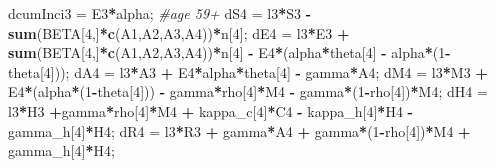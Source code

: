 \documentclass[
]{article}
\newenvironment{Shaded}{\begin{snugshade}}{\end{snugshade}}
\newcommand{\CommentTok}[1]{\textcolor[rgb]{0.56,0.35,0.01}{\textit{#1}}}
\newcommand{\DecValTok}[1]{\textcolor[rgb]{0.00,0.00,0.81}{#1}}
\newcommand{\KeywordTok}[1]{\textcolor[rgb]{0.13,0.29,0.53}{\textbf{#1}}}
\newcommand{\NormalTok}[1]{#1}
\newcommand{\OperatorTok}[1]{\textcolor[rgb]{0.81,0.36,0.00}{\textbf{#1}}}
\newcommand{\StringTok}[1]{\textcolor[rgb]{0.31,0.60,0.02}{#1}}
\begin{document}
\begin{Shaded}
\begin{Highlighting}[]
\NormalTok{    dcumInci3 =}\StringTok{ }\NormalTok{E3}\OperatorTok{*}\NormalTok{alpha;}
  \CommentTok{#age 59+}
\NormalTok{    dS4 =}\StringTok{ }\NormalTok{l3}\OperatorTok{*}\NormalTok{S3 }\OperatorTok{-}\StringTok{ }\KeywordTok{sum}\NormalTok{(BETA[}\DecValTok{4}\NormalTok{,]}\OperatorTok{*}\KeywordTok{c}\NormalTok{(A1,A2,A3,A4))}\OperatorTok{*}\NormalTok{n[}\DecValTok{4}\NormalTok{];}
\NormalTok{    dE4 =}\StringTok{ }\NormalTok{l3}\OperatorTok{*}\NormalTok{E3 }\OperatorTok{+}\StringTok{ }\KeywordTok{sum}\NormalTok{(BETA[}\DecValTok{4}\NormalTok{,]}\OperatorTok{*}\KeywordTok{c}\NormalTok{(A1,A2,A3,A4))}\OperatorTok{*}\NormalTok{n[}\DecValTok{4}\NormalTok{] }\OperatorTok{-}\StringTok{ }\NormalTok{E4}\OperatorTok{*}\NormalTok{(alpha}\OperatorTok{*}\NormalTok{theta[}\DecValTok{4}\NormalTok{] }\OperatorTok{-}\StringTok{ }\NormalTok{alpha}\OperatorTok{*}\NormalTok{(}\DecValTok{1}\OperatorTok{-}\NormalTok{theta[}\DecValTok{4}\NormalTok{]));}
\NormalTok{    dA4 =}\StringTok{ }\NormalTok{l3}\OperatorTok{*}\NormalTok{A3 }\OperatorTok{+}\StringTok{ }\NormalTok{E4}\OperatorTok{*}\NormalTok{alpha}\OperatorTok{*}\NormalTok{theta[}\DecValTok{4}\NormalTok{] }\OperatorTok{-}\StringTok{ }\NormalTok{gamma}\OperatorTok{*}\NormalTok{A4;}
\NormalTok{    dM4 =}\StringTok{ }\NormalTok{l3}\OperatorTok{*}\NormalTok{M3 }\OperatorTok{+}\StringTok{ }\NormalTok{E4}\OperatorTok{*}\NormalTok{(alpha}\OperatorTok{*}\NormalTok{(}\DecValTok{1}\OperatorTok{-}\NormalTok{theta[}\DecValTok{4}\NormalTok{])) }\OperatorTok{-}\StringTok{ }\NormalTok{gamma}\OperatorTok{*}\NormalTok{rho[}\DecValTok{4}\NormalTok{]}\OperatorTok{*}\NormalTok{M4 }\OperatorTok{-}\StringTok{ }\NormalTok{gamma}\OperatorTok{*}\NormalTok{(}\DecValTok{1}\OperatorTok{-}\NormalTok{rho[}\DecValTok{4}\NormalTok{])}\OperatorTok{*}\NormalTok{M4;}
\NormalTok{    dH4 =}\StringTok{ }\NormalTok{l3}\OperatorTok{*}\NormalTok{H3 }\OperatorTok{+}\NormalTok{gamma}\OperatorTok{*}\NormalTok{rho[}\DecValTok{4}\NormalTok{]}\OperatorTok{*}\NormalTok{M4 }\OperatorTok{+}\StringTok{ }\NormalTok{kappa_c[}\DecValTok{4}\NormalTok{]}\OperatorTok{*}\NormalTok{C4 }\OperatorTok{-}\StringTok{ }\NormalTok{kappa_h[}\DecValTok{4}\NormalTok{]}\OperatorTok{*}\NormalTok{H4 }\OperatorTok{-}\StringTok{ }\NormalTok{gamma_h[}\DecValTok{4}\NormalTok{]}\OperatorTok{*}\NormalTok{H4;}
\NormalTok{    dR4 =}\StringTok{ }\NormalTok{l3}\OperatorTok{*}\NormalTok{R3 }\OperatorTok{+}\StringTok{ }\NormalTok{gamma}\OperatorTok{*}\NormalTok{A4 }\OperatorTok{+}\StringTok{ }\NormalTok{gamma}\OperatorTok{*}\NormalTok{(}\DecValTok{1}\OperatorTok{-}\NormalTok{rho[}\DecValTok{4}\NormalTok{])}\OperatorTok{*}\NormalTok{M4 }\OperatorTok{+}\StringTok{ }\NormalTok{gamma_h[}\DecValTok{4}\NormalTok{]}\OperatorTok{*}\NormalTok{H4;}

\end{Highlighting}
\end{Shaded}
\end{document}
